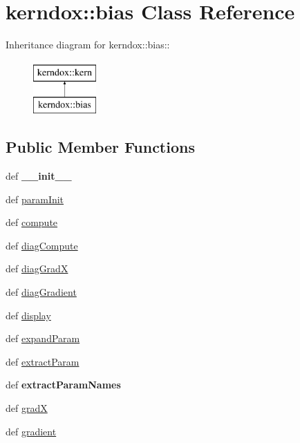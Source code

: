 \hypertarget{classkerndox_1_1bias}{
\section{kerndox::bias Class Reference}
\label{classkerndox_1_1bias}
}
Inheritance diagram for kerndox::bias::\begin{figure}[H]
\begin{center}
\leavevmode
\includegraphics[height=2cm]{classkerndox_1_1bias}
\end{center}
\end{figure}
\subsection*{Public Member Functions}
\begin{CompactItemize}
\item 
\hypertarget{classkerndox_1_1bias_6b49a4ecfb36a98c6fc5485d7b56e5d6}{
def \textbf{\_\-\_\-init\_\-\_\-}}
\label{classkerndox_1_1bias_6b49a4ecfb36a98c6fc5485d7b56e5d6}

\item 
def \hyperlink{classkerndox_1_1bias_7fa82a25834e1b5253409e86e2dbba02}{paramInit}
\item 
def \hyperlink{classkerndox_1_1bias_378a35b6a66d06ae6275e7bb72496012}{compute}
\item 
def \hyperlink{classkerndox_1_1bias_2a8cdcea02456f6083c608daa0e8449a}{diagCompute}
\item 
def \hyperlink{classkerndox_1_1bias_3f9d5af55498317e3fb015d274efabbf}{diagGradX}
\item 
def \hyperlink{classkerndox_1_1bias_66d203c06ed866e4f1c9a09e13a9a142}{diagGradient}
\item 
def \hyperlink{classkerndox_1_1bias_93abbcf30b93880cdddc8b3d5e5b6cb6}{display}
\item 
def \hyperlink{classkerndox_1_1bias_a884620ce9dd942d85f25f3de4703a31}{expandParam}
\item 
def \hyperlink{classkerndox_1_1bias_af12f2b815114cc8b2203236ff333364}{extractParam}
\item 
\hypertarget{classkerndox_1_1bias_7356296b48570bcc12fa549d2ccf8293}{
def \textbf{extractParamNames}}
\label{classkerndox_1_1bias_7356296b48570bcc12fa549d2ccf8293}

\item 
def \hyperlink{classkerndox_1_1bias_d19a0539d91a6cf8deda239b18bd7163}{gradX}
\item 
def \hyperlink{classkerndox_1_1bias_f7f4db511633014f8acf332a7ef0fa78}{gradient}
\end{CompactItemize}
